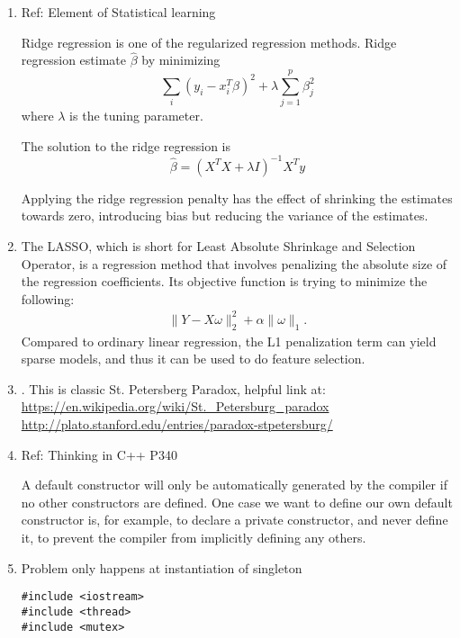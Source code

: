 \documentclass[10pt, onecolumn, draftcls]{IEEEtran}
\begin{document}
\begin{enumerate}
(b) If the left door is locked, then when the drunk man hit -1, he still need to move right for 100 steps. Since left and right are symmetric, we know this is equivalent that we have two doors at -101 and 99. Thus, by the same analysis as part (a), we know $E[\tau]=9999$.

\item
Ref: Element of Statistical learning

Ridge regression is one of the regularized  regression methods. Ridge regression estimate $\hat{\beta}$ by minimizing
$$
\sum_i (y_i-x_i^T\beta)^2 + \lambda \sum_{j=1}^p \beta_j^2
$$
where $\lambda$ is the tuning parameter.

The solution to the ridge regression is 
$$
\hat{\beta} = (X^TX + \lambda I)^{-1}X^Ty
$$

Applying the ridge regression penalty has the effect of shrinking the estimates towards zero, introducing bias but reducing the variance of the estimates.

\item
The LASSO, which is short for Least Absolute Shrinkage and Selection Operator, is a regression method that involves penalizing the absolute size of the regression coefficients. Its objective function is trying to minimize the following:
\begin{align}
\|Y-X\omega\|_{2}^{2} + \alpha\|\omega\|_{1}. \nonumber 
\end{align}
Compared to ordinary linear regression, the L1 penalization term can yield sparse models, and thus it can be used to do feature selection.

\item.
This is classic St. Petersberg Paradox, helpful link at:
\url{https://en.wikipedia.org/wiki/St._Petersburg_paradox}
\url{http://plato.stanford.edu/entries/paradox-stpetersburg/}

\item
Ref: Thinking in C++ P340

A default constructor will only be automatically generated by the compiler if no other constructors are defined.  One case we want to define our own default constructor is,  for example, to declare a private constructor, and never define it, to prevent the compiler from implicitly defining any others.

\item
Problem only happens at instantiation of singleton
\begin{lstlisting}
#include <iostream>
#include <thread>         
#include <mutex>


\end{lstlisting}
\end{enumerate}
\end{document}
